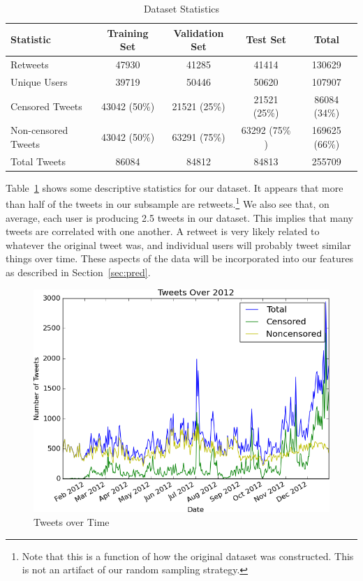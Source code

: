 \documentclass{sig-alternate-05-2015}
\begin{document}
\begin{table}
  \centering
  \begin{tabular}{|l|c|c|c|c|}
    \hline
    Statistic & Training Set & Validation Set & Test Set & Total \\
    \hline
    Retweets & 47930 & 41285 & 41414 & 130629 \\
    Unique Users & 39719 & 50446 & 50620 & 107907 \\
    \hline
    Censored Tweets & 43042 (50\%) & 21521 (25\%) & 21521 (25\%) & 86084 (34\%)  \\
    Non-censored Tweets & 43042 (50\%) & 63291 (75\%) & 63292 (75\% )& 169625 (66\%) \\
    Total Tweets & 86084 & 84812 & 84813 & 255709 \\
    \hline
  \end{tabular}
  \caption{Dataset Statistics}
  \label{tab:descript}
\end{table}

Table~\ref{tab:descript} shows some descriptive statistics for our dataset. It appears that more than half of the tweets in our subsample are retweets.\footnote{Note that this is a function of how the original dataset was constructed. This is not an artifact of our random sampling strategy.} We also see that, on average, each user is producing 2.5 tweets in our dataset. This implies that many tweets are correlated with one another. A retweet is very likely related to whatever the original tweet was, and individual users will probably tweet similar things over time. These aspects of the data will be incorporated into our features as described in Section~\ref{sec:pred}.

\begin{figure}
  \centering
  \includegraphics[scale=0.5]{tweetTime.png}
  \caption{Tweets over Time}
  \label{fig:ts}
\end{figure}
\end{document}
